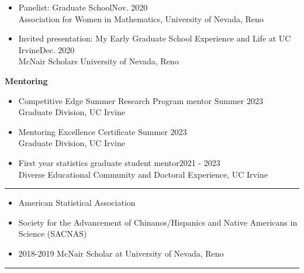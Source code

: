 \documentclass{article}
\begin{document}
\begin{description}
\begin{itemize}
			\item Panelist: Graduate School\hfill{Nov. 2020}\\
			Association for Women in Mathematics, University of Nevada, Reno
			
			\item Invited presentation: My Early Graduate School Experience and Life at UC Irvine\hfill{Dec. 2020}\\
			McNair Scholars University of Nevada, Reno
		\end{itemize}
		
		\textbf{Mentoring}
		\begin{itemize}
			\item Competitive Edge Summer Research Program mentor \hfill{Summer 2023}\\
			Graduate Division, UC Irvine 
			
			\item Mentoring Excellence Certificate \hfill{Summer 2023}\\
			Graduate Division, UC Irvine
			
			\item First year statistics graduate student mentor\hfill{2021 - 2023}\\
			Diverse Educational Community and Doctoral Experience, UC Irvine
		\end{itemize}
		
	\end{description}
	\vspace{-2mm}
	\rule{\linewidth}{1pt}
	
	
	
	\begin{description}
		\vspace{-2mm}
		\item[Programs and Professional Membership]\hspace*{.01in}
		
		\begin{itemize}
			\item American Statistical Association
			
			\item Society for the Advancement of Chinanos/Hispanics and Native Americans in Science (SACNAS)
			
			\item 2018-2019 McNair Scholar at University of Nevada, Reno
		\end{itemize}
	\end{description}
	\vspace{-2mm}
	\rule{\linewidth}{1pt}
	
\end{document}
